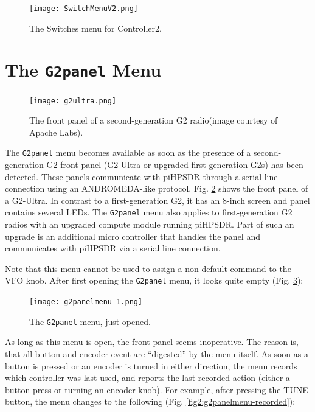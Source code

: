 \documentclass[12pt]{book}
\def\bltt#1{\texttt{\color{blue}#1}}
\def\pH{pi\-HPSDR\xspace}
\begin{document}
\begin{figure}[ht]
\center
\texttt{[image: SwitchMenuV2.png]}
\caption{The Switches menu for Controller2.}
\label{fig:SwitchMenuV2}
\end{figure}
\section{The \texttt{G2panel} Menu}
\label{sec:G2panelMenu}

\begin{figure}[ht]
\center
\texttt{[image: g2ultra.png]}
\caption{The front panel of a second-generation G2 radio(image courtesy of Apache Labs).}
\label{fig:g2ultrapanel}
\end{figure}

The \bltt{G2panel} menu becomes available as soon as the presence of a second-generation G2 front panel
(G2 Ultra or upgraded first-generation G2s) has been detected. These panels communicate with \pH through
a serial line connection using an ANDROMEDA-like protocol. Fig. \ref{fig:g2ultrapanel} shows the front
panel of a G2-Ultra. In contrast to a first-generation G2, it has an 8-inch screen and panel contains
several LEDs. The \bltt{G2panel} menu also applies to first-generation G2 radios with an upgraded
compute module running \pH. Part of such an upgrade is an additional micro controller that handles the
panel and communicates with \pH via a serial line connection.

Note that this menu cannot be used to assign a non-default command to the VFO knob.
After first opening the \bltt{G2panel} menu, it looks quite empty (Fig. \ref{fig:g2panelmenu-initial}):

\begin{figure}[ht]
\center
\texttt{[image: g2panelmenu-1.png]}
\caption{The \bltt{G2panel} menu, just opened.}
\label{fig:g2panelmenu-initial}
\end{figure}

As long as this menu is open, the front panel seems inoperative. The reason is, that all button and
encoder event are ``digested'' by the menu itself. As soon as a button is pressed or an encoder is
turned in either direction, the menu records which controller was last used, and reports the last
recorded action (either a button press or turning an encoder knob). For example, after pressing
the TUNE button, the menu changes to the following (Fig. \ref{fig2:g2panelmenu-recorded}):
\end{document}
